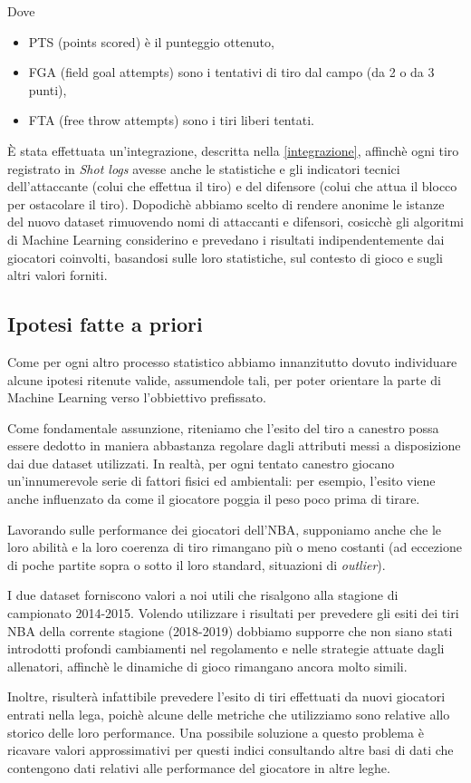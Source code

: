 Dove
\begin{itemize}
\item PTS (points scored) è il punteggio ottenuto,
\item FGA (field goal attempts) sono i tentativi di tiro dal campo (da 2 o da 3 punti),
\item FTA (free throw attempts) sono i tiri liberi tentati.
\end{itemize}

È stata effettuata un'integrazione, descritta nella \autoref{integrazione},  affinchè ogni tiro registrato in \textit{Shot logs} avesse anche le statistiche e gli indicatori tecnici dell'attaccante (colui che effettua il tiro) e del difensore (colui che attua il blocco per ostacolare il tiro). Dopodichè abbiamo scelto di rendere anonime le istanze del nuovo dataset rimuovendo nomi di attaccanti e difensori, cosicchè gli algoritmi di Machine Learning considerino e prevedano i risultati indipendentemente dai giocatori coinvolti, basandosi sulle loro statistiche, sul contesto di gioco e sugli altri valori forniti.

\subsection{Ipotesi fatte a priori}

Come per ogni altro processo statistico abbiamo innanzitutto dovuto individuare alcune ipotesi ritenute valide, assumendole tali, per poter orientare la parte di Machine Learning verso l'obbiettivo prefissato.
\par
Come fondamentale assunzione, riteniamo che l'esito del tiro a canestro possa essere dedotto in maniera abbastanza regolare dagli attributi messi a disposizione dai due dataset utilizzati. In realtà, per ogni tentato canestro giocano un'innumerevole serie di fattori fisici ed ambientali: per esempio, l'esito viene anche influenzato da come il giocatore poggia il peso poco prima di tirare.
\par
Lavorando sulle performance dei giocatori dell'NBA, supponiamo anche che le loro abilità e la loro coerenza di tiro rimangano più o meno costanti (ad eccezione di poche partite sopra o sotto il loro standard, situazioni di \textit{outlier}).
\par
I due dataset forniscono valori a noi utili che risalgono alla stagione di campionato 2014-2015. Volendo utilizzare i risultati per prevedere gli esiti dei tiri NBA della corrente stagione (2018-2019) dobbiamo supporre che non siano stati introdotti profondi cambiamenti nel regolamento e nelle strategie attuate dagli allenatori, affinchè le dinamiche di gioco rimangano ancora molto simili.
\par
Inoltre, risulterà infattibile prevedere l'esito di tiri effettuati da nuovi giocatori entrati nella lega, poichè alcune delle metriche che utilizziamo sono relative allo storico delle loro performance. 
Una possibile soluzione a questo problema è ricavare valori approssimativi per questi indici consultando altre basi di dati che contengono dati relativi alle performance del giocatore in altre leghe.

